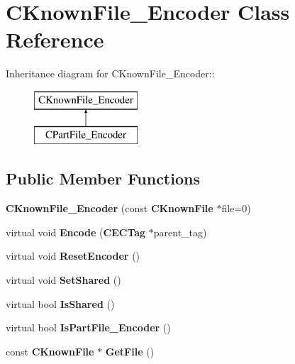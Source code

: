 \section{CKnownFile\_\-Encoder Class Reference}
\label{classCKnownFile__Encoder}
Inheritance diagram for CKnownFile\_\-Encoder::\begin{figure}[H]
\begin{center}
\leavevmode
\includegraphics[height=2cm]{classCKnownFile__Encoder}
\end{center}
\end{figure}
\subsection*{Public Member Functions}
\begin{DoxyCompactItemize}
\item 
{\bfseries CKnownFile\_\-Encoder} (const {\bf CKnownFile} $\ast$file=0)\label{classCKnownFile__Encoder_a77b51d94c696598f2a15fec7df78c120}

\item 
virtual void {\bfseries Encode} ({\bf CECTag} $\ast$parent\_\-tag)\label{classCKnownFile__Encoder_a72efaf9b1825d66b11f3e38e98ced1b2}

\item 
virtual void {\bfseries ResetEncoder} ()\label{classCKnownFile__Encoder_ae15fa964a558770333aa9672aaa056f7}

\item 
virtual void {\bfseries SetShared} ()\label{classCKnownFile__Encoder_a5aa21811385ddec0b1c9d8c0e8681a26}

\item 
virtual bool {\bfseries IsShared} ()\label{classCKnownFile__Encoder_a0e859319b17dfdf0f95bf4f66e73441f}

\item 
virtual bool {\bfseries IsPartFile\_\-Encoder} ()\label{classCKnownFile__Encoder_a3f14cb2d374d5045d550327e1163bf03}

\item 
const {\bf CKnownFile} $\ast$ {\bfseries GetFile} ()\label{classCKnownFile__Encoder_a2520e39885df4913ac787997f256f883}

\end{DoxyCompactItemize}
